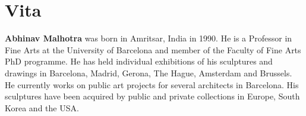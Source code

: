 \chapter*{Vita}
\textbf{Abhinav Malhotra} was born in Amritsar, India in 1990. He is a Professor in Fine Arts at the University of Barcelona and member of the Faculty of Fine Arts PhD programme. He has held individual exhibitions of his sculptures and drawings in Barcelona, Madrid, Gerona, The Hague, Amsterdam and Brussels. He currently works on public art projects for several architects in Barcelona. His sculptures have been acquired by public and private collections in Europe, South Korea and the USA.
